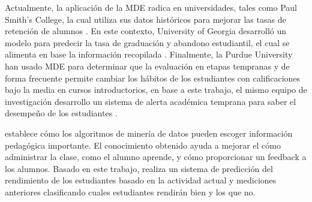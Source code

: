 Actualmente, la aplicación de la MDE radica en universidades, tales como Paul Smith’s College, la cual utiliza sus datos históricos para mejorar las tasas de retención de alumnos \parencite{bichsel2012analytics}. En este contexto, University of Georgia desarrolló un modelo para predecir la tasa de graduación y abandono estudiantil, el cual se alimenta en base la información recopilada \parencite{morris2005predicting}. Finalmente, la Purdue University han usado MDE para determinar que la evaluación en etapas tempranas y de forma frecuente permite cambiar los hábitos de los estudiantes con calificaciones bajo la media en cursos introductorios, en base a este trabajo, el mismo equipo de investigación desarrollo un sistema de alerta académica temprana para saber el desempeño de los estudiantes \parencite{baepler2010academic}. 

\textcite{merceron2005educational} establece cómo los algoritmos de minería de datos pueden escoger información pedagógica importante. El conocimiento obtenido ayuda a mejorar el cómo administrar la clase, como el alumno aprende, y cómo proporcionar un feedback a los alumnos. Basado en este trabajo, \textcite{abdullah2014students} realiza un sistema de predicción del rendimiento de los estudiantes basado en la actividad actual y mediciones anteriores clasificando cuales estudiantes rendirán bien y los que no. 





